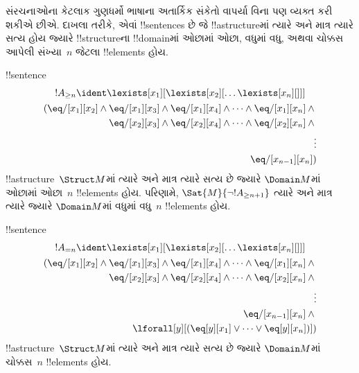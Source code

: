 \documentclass[../../../include/open-logic-section]{subfiles}
\begin{document}


\begin{explain}
સંરચનાઓના કેટલાક ગુણધર્મો ભાષાના અતાર્કિક સંકેતો વાપર્યા વિના પણ
વ્યક્ત કરી શકીએ છીએ. દાખલા તરીકે, એવાં !!{sentence}s છે જે
!!a{structure}માં ત્યારે અને માત્ર ત્યારે સત્ય હોય જ્યારે
!!{structure}ના !!{domain}માં ઓછામાં ઓછા, વધુમાં વધુ, અથવા ચોક્કસ
આપેલી સંખ્યા~$n$ જેટલા !!{element}s હોય.
\end{explain}

\begin{prop}
!!{sentence}
\begin{multline*}
  !A_{\ge n} \ident \lexists[x_1][\lexists[x_2][\dots\lexists[x_n][{}]]]\\
  \begin{aligned}
  (\eq/[x_1][x_2] \land {}
  \eq/[x_1][x_3] \land \eq/[x_1][x_4] \land \dots \land \eq/[x_1][x_n] \land {}\\
\eq/[x_2][x_3] \land \eq/[x_2][x_4] \land \dots \land {} \eq/[x_2][x_n] \land {} \\
\vdots\\
\eq/[x_{n-1}][x_n])
\end{aligned}
\end{multline*}
!!a{structure}~$\Struct M$માં ત્યારે અને માત્ર ત્યારે સત્ય છે જ્યારે
$\Domain M$માં ઓછામાં ઓછા~$n$ !!{element}s હોય. પરિણામે,
$\Sat{M}{\lnot !A_{\ge n+1}}$ ત્યારે અને માત્ર ત્યારે જ્યારે
$\Domain M$માં વધુમાં વધુ~$n$ !!{element}s હોય.

\end{prop}

\begin{prop}
!!{sentence}
\begin{multline*}
!A_{= n} \ident \lexists[x_1][\lexists[x_2][\dots\lexists[x_n][{}]]] \\
\begin{aligned}
  (\eq/[x_1][x_2] \land {}
  \eq/[x_1][x_3] \land \eq/[x_1][x_4] \land \dots \land \eq/[x_1][x_n] \land {}\\
\eq/[x_2][x_3] \land \eq/[x_2][x_4] \land \dots \land {} \eq/[x_2][x_n] \land {} \\
\vdots\\
\eq/[x_{n-1}][x_n] \land {} \\
\lforall[y][(\eq[y][x_1] \lor \dots \lor \eq[y][x_n])])
\end{aligned}
\end{multline*}
!!a{structure}~$\Struct M$માં ત્યારે અને માત્ર ત્યારે સત્ય છે જ્યારે
$\Domain M$માં ચોક્કસ~$n$ !!{element}s હોય.
\end{prop}
\end{document}
